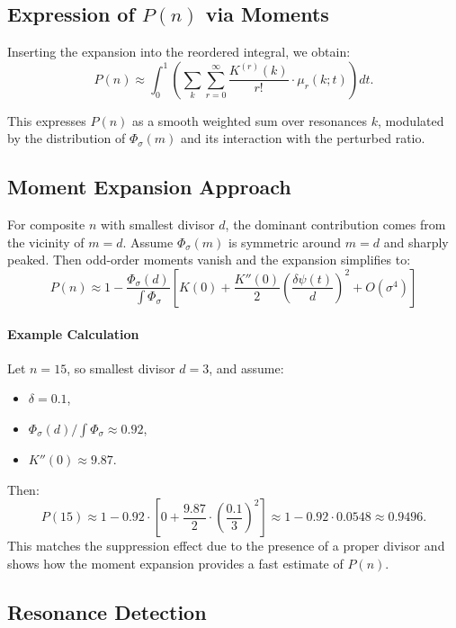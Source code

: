 \documentclass[12pt]{article}
\theoremstyle{definition}
\theoremstyle{plain}
\theoremstyle{remark}
\begin{document}
\subsection{\texorpdfstring{Expression of \( P(n) \) via Moments}{Expression of P(n) via Moments}}
Inserting the expansion into the reordered integral, we obtain:
\begin{equation}
P(n) \approx \int_0^1 \left( \sum_k \sum_{r=0}^\infty \frac{K^{(r)}(k)}{r!} \cdot \mu_r(k; t) \right) dt.
\label{eq:moment_expansion}
\end{equation}

This expresses \( P(n) \) as a smooth weighted sum over resonances \( k \), modulated by the distribution of \( \Phi_\sigma(m) \) and its interaction with the perturbed ratio.

\subsection{Moment Expansion Approach}

For composite \( n \) with smallest divisor \( d \), the dominant contribution comes from the vicinity of \( m = d \). Assume \( \Phi_\sigma(m) \) is symmetric around \( m = d \) and sharply peaked. Then odd-order moments vanish and the expansion simplifies to:
\[
P(n) \approx 1 - \frac{\Phi_\sigma(d)}{\int \Phi_\sigma} \left[
K(0) + \frac{K''(0)}{2} \left( \frac{\delta \psi(t)}{d} \right)^2 + O(\sigma^4)
\right]
\]

\paragraph{Example Calculation}
Let \( n = 15 \), so smallest divisor \( d = 3 \), and assume:
\begin{itemize}
  \item \( \delta = 0.1 \),
  \item \( \Phi_\sigma(d) / \int \Phi_\sigma \approx 0.92 \),
  \item \( K''(0) \approx 9.87 \).
\end{itemize}
Then:
\[
P(15) \approx 1 - 0.92 \cdot \left[ 0 + \frac{9.87}{2} \cdot \left(\frac{0.1}{3}\right)^2 \right] \approx 1 - 0.92 \cdot 0.0548 \approx 0.9496.
\]
This matches the suppression effect due to the presence of a proper divisor and shows how the moment expansion provides a fast estimate of \( P(n) \).

\subsection{Resonance Detection}
\label{sec:resonance-map}
\end{document}
